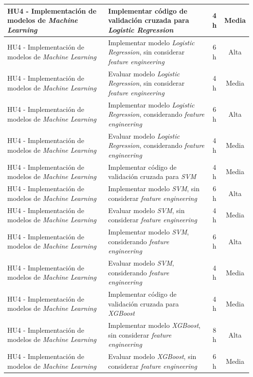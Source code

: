 \documentclass[
11pt, %
]{charter}
\begin{document}
\begin{xltabular}{\linewidth}{@{}|X|X|c|c|@{}}
HU4 - Implementación de modelos de \textit{Machine Learning} & Implementar código de validación cruzada para \textit{Logistic Regression} & 4 h & Media \\ \hline
HU4 - Implementación de modelos de \textit{Machine Learning} & Implementar modelo \textit{Logistic Regression}, sin considerar \textit{feature engineering} & 6 h & Alta \\ \hline
HU4 - Implementación de modelos de \textit{Machine Learning} & Evaluar modelo \textit{Logistic Regression}, sin considerar \textit{feature engineering} & 4 h & Media \\ \hline
HU4 - Implementación de modelos de \textit{Machine Learning} & Implementar modelo \textit{Logistic Regression}, considerando \textit{feature engineering} & 6 h & Alta \\ \hline
HU4 - Implementación de modelos de \textit{Machine Learning} & Evaluar modelo \textit{Logistic Regression}, considerando \textit{feature engineering} & 4 h & Media \\ \hline
HU4 - Implementación de modelos de \textit{Machine Learning} & Implementar código de validación cruzada para \textit{SVM} & 4 h & Media \\ \hline
HU4 - Implementación de modelos de \textit{Machine Learning} & Implementar modelo \textit{SVM}, sin considerar \textit{feature engineering} & 6 h & Alta \\ \hline
HU4 - Implementación de modelos de \textit{Machine Learning} & Evaluar modelo \textit{SVM}, sin considerar \textit{feature engineering} & 4 h & Media \\ \hline
HU4 - Implementación de modelos de \textit{Machine Learning} & Implementar modelo \textit{SVM}, considerando \textit{feature engineering} & 6 h & Alta \\ \hline
HU4 - Implementación de modelos de \textit{Machine Learning} & Evaluar modelo \textit{SVM}, considerando \textit{feature engineering} & 4 h & Media \\ \hline
HU4 - Implementación de modelos de \textit{Machine Learning} & Implementar código de validación cruzada para \textit{XGBoost} & 4 h & Media \\ \hline
HU4 - Implementación de modelos de \textit{Machine Learning} & Implementar modelo \textit{XGBoost}, sin considerar \textit{feature engineering} & 8 h & Alta \\ \hline
HU4 - Implementación de modelos de \textit{Machine Learning} & Evaluar modelo \textit{XGBoost}, sin considerar \textit{feature engineering} & 6 h & Media \\ \hline

\end{xltabular}
\end{document}
